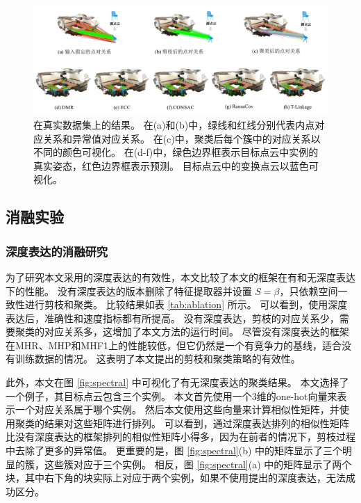 \begin{figure}
        \centering
        \includegraphics[width=1.0\textwidth]{images/DMR_real.pdf}
        \caption{
          在真实数据集上的结果。
          在(a)和(b)中，绿线和红线分别代表内点对应关系和异常值对应关系。
          在(c)中，聚类后每个簇中的对应关系以不同的颜色可视化。
          在(d-f)中，绿色边界框表示目标点云中实例的真实姿态，红色边界框表示预测。
          目标点云中的变换点云以蓝色可视化。
        }
        \label{fig:DMR_real}
\end{figure}
      
\subsection{消融实验}
\label{sec:ablation}
\subsubsection{深度表达的消融研究}为了研究本文采用的深度表达的有效性，本文比较了本文的框架在有和无深度表达下的性能。
没有深度表达的版本删除了特征提取器并设置 $S=\beta$，只依赖空间一致性进行剪枝和聚类。
比较结果如表 \ref{tab:ablation} 所示。
可以看到，使用深度表达后，准确性和速度指标都有所提高。
没有深度表达，剪枝的对应关系少，需要聚类的对应关系多，这增加了本文方法的运行时间。
尽管没有深度表达的框架在MHR、MHP和MHF1上的性能较低，但它仍然是一个有竞争力的基线，适合没有训练数据的情况。
这表明了本文提出的剪枝和聚类策略的有效性。

此外，本文在图 \ref{fig:spectral} 中可视化了有无深度表达的聚类结果。
本文选择了一个例子，其目标点云包含三个实例。
本文首先使用一个3维的one-hot向量来表示一个对应关系属于哪个实例。
然后本文使用这些向量来计算相似性矩阵，并使用聚类的结果对这些矩阵进行排列。
可以看到，通过深度表达排列的相似性矩阵比没有深度表达的框架排列的相似性矩阵小得多，因为在前者的情况下，剪枝过程中去除了更多的异常值。
更重要的是，图 \ref{fig:spectral}(b) 中的矩阵显示了三个明显的簇，这些簇对应于三个实例。
相反，图 \ref{fig:spectral}(a) 中的矩阵显示了两个块，其中右下角的块实际上对应于两个实例，如果不使用提出的深度表达，无法成功区分。

